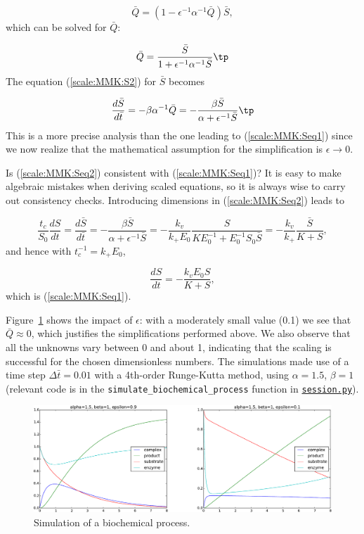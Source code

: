 \documentclass[graybox,envcountchap,sectrefs,final]{svmonodo}
\begin{document}
\[ \bar Q = (1 - \epsilon^{-1}\alpha^{-1}\bar Q)\bar S,\]
which can be solved for $\bar Q$:

\[ \bar Q = \frac{\bar S}{1 + \epsilon^{-1}\alpha^{-1}\bar S}\tp\]
The equation (\ref{scale:MMK:S2}) for $\bar S$ becomes

\begin{equation}
\frac{d\bar S}{d\bar t} = -\beta\alpha^{-1}\bar Q =
-\frac{\beta\bar S}{\alpha + \epsilon^{-1}\bar S}\tp
\label{scale:MMK:Seq2}
\end{equation}
This is a more precise analysis than the one leading to
(\ref{scale:MMK:Seq1}) since we now realize that the
mathematical assumption for the simplification is
$\epsilon\rightarrow 0$.

Is (\ref{scale:MMK:Seq2}) consistent with (\ref{scale:MMK:Seq1})? It is
easy to make algebraic mistakes when deriving scaled equations,
so it is always wise to carry out consistency checks.
Introducing dimensions in (\ref{scale:MMK:Seq2}) leads to

\[
\frac{t_c}{S_0}\frac{d S}{dt} =
\frac{d\bar S}{d\bar t}  =
-\frac{\beta\bar S}{\alpha + \epsilon^{-1}\bar S}
= -\frac{k_v}{k_+E_0}\frac{S}{KE_0^{-1} + E_0^{-1}S_0\bar S}
= -\frac{k_v}{k_+}\frac{\bar S}{K + S},\]
and hence with $t_c^{-1}=k_+E_0$,

\[ \frac{dS}{dt} = -\frac{k_vE_0 S}{K + S},\]
which is (\ref{scale:MMK:Seq1}).

Figure~\ref{scale:MMK:fig} shows the impact of $\epsilon$: with a moderately small
value (0.1) we see that $\bar Q\approx 0$, which justifies the
simplifications performed above. We also observe that all the unknowns
vary between 0 and about 1, indicating that the scaling is successful
for the chosen dimensionless numbers. The simulations made use of
a time step $\Delta\bar t=0.01$ with a 4th-order Runge-Kutta method,
using $\alpha=1.5$, $\beta=1$ (relevant code is in the
\Verb!simulate_biochemical_process! function in \href{{http://tinyurl.com/o8pb3yy/session.py}}{\nolinkurl{session.py}}).


\begin{figure}[!ht]  %
  \centerline{\includegraphics[width=1.0\linewidth]{fig-scaling/biochem.pdf}}
  \caption{
  Simulation of a biochemical process. \label{scale:MMK:fig}
  }
\end{figure}
\end{document}
